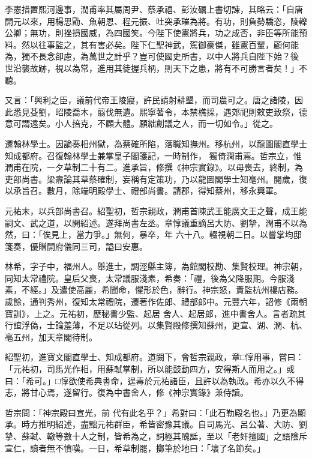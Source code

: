 \begin{pinyinscope}
 李憲措置熙河邊事，潤甫率其屬周尹、蔡承禧、彭汝礪上書切諫，其略云：「自唐開元以來，用楊思勖、魚朝恩、程元振、吐突承璀為將。有功，則負勢驕恣，陵轢公卿；無功，則挫損國威，為四國笑。今陛下使憲將兵，功之成否，非臣等所能預料。然以往事監之，其有害必矣。陛下仁聖神武，駕御豪傑，雖憲百輩，顧何能為，獨不長念卻慮，為萬世之計乎？豈可使國史所書，以中人將兵自陛下始？後
 世沿襲故跡，視以為常，進用其徒握兵柄，則天下之患，將有不可勝言者矣！」不聽。



 又言：「興利之臣，議前代帝王陵寢，許民請射耕墾，而司農可之。唐之諸陵，因此悉見芟劉，昭陵喬木，翦伐無遺。熙寧著令，本禁樵採，遇郊祀則敕吏致祭，德意可謂遠矣。小人掊克，不顧大體。願絀創議之人，而一切如令。」從之。



 遷翰林學士。因論奏相州獄，為蔡確所陷，落職知撫州。移杭州，以龍圖閣直學士知成都府。召復翰林學士兼掌皇子閣箋記，一時制作，
 獨倚潤甫焉。哲宗立，惟潤甫在院，一夕草制二十有二。進承旨，修撰《神宗實錄》。以母喪去，終制，為吏部尚書。梁燾論其草蔡確制，妄稱有定策功，乃以龍圖閣學士知亳州。閱歲，復以承旨召。數月，除端明殿學士、禮部尚書。請郡，得知蔡州，移永興軍。



 元祐末，以兵部尚書召。紹聖初，哲宗親政，潤甫首陳武王能廣文王之聲，成王能嗣文、武之道，以開紹述。遂拜尚書左丞。章惇議重謫呂大防、劉摯，潤甫不以為然，曰：「俟見上，當力爭。」無何，暴卒，年
 六十八。輟視朝二日。以嘗掌均邸箋奏，優贈開府儀同三司，謚曰安惠。



 林希，字子中，福州人。舉進士，調涇縣主簿，為館閣校勘、集賢校理。神宗朝，同知太常禮院。皇后父喪，太常議服淺素，希奏：「禮，後為父降服期。今服淺素，不經。」及遣使高麗，希聞命，懼形於色，辭行。神宗怒，責監杭州樓店務。歲餘，通判秀州，復知太常禮院，遷著作佐郎、禮部郎中。元豐六年，詔修《兩朝寶訓》，上之。元祐初，歷秘書少監、起居
 舍人、起居郎，進中書舍人。言者疏其行誼浮偽，士論羞薄，不足以玷從列。以集賢殿修撰知蘇州，更宣、湖、潤、杭、亳五州，加天章閣待制。



 紹聖初，進寶文閣直學士、知成都府。道闕下，會哲宗親政，章□惇用事，嘗曰：「元祐初，司馬光作相，用蘇軾掌制，所以能鼓動四方，安得斯人而用之。」或曰：「希可。」□惇欲使希典書命，逞毒於元祐諸臣，且許以為執政。希亦以久不得志，將甘心焉，遂留行。復為中書舍人，修《神宗實錄》兼侍讀。



 哲宗問：「神宗殿曰宣光，前
 代有此名乎？」希對曰：「此石勒殿名也。」乃更為顯承。時方推明紹述，盡黜元祐群臣，希皆密豫其議。自司馬光、呂公著、大防、劉摯、蘇軾、轍等數十人之制，皆希為之，詞極其醜詆，至以「老奸擅國」之語陰斥宣仁，讀者無不憤嘆。一日，希草制罷，擲筆於地曰：「壞了名節矣。」




\end{pinyinscope}
